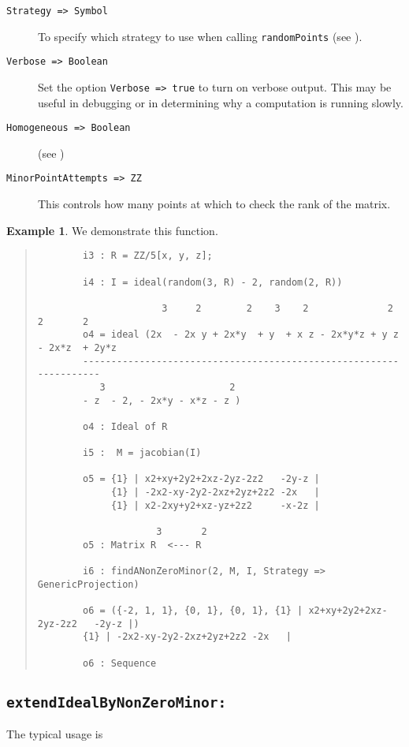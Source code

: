 \documentclass[11pt]{amsart}
\theoremstyle{definition}
\newtheorem{example}{Example}[section]
\begin{document}
\begin{description}
\item[\tt Strategy => Symbol] To specify which strategy to use when calling {\tt randomPoints} (see ).
  
\item[\tt Verbose => Boolean]
  Set the option {\tt Verbose => true} to turn on verbose output.  This may be useful in debugging or in determining why a computation is running slowly.
  
\item[\tt Homogeneous => Boolean] (see )
  
\item[\tt MinorPointAttempts => ZZ] 
  This controls how many points at which to check the rank of the matrix.
\end{description}
\vspace{0.25em}
\begin{example}
  We demonstrate this function.
  ~~
  {{\small\color{blue}
  \begin{quote}
\begin{verbatim}
		i3 : R = ZZ/5[x, y, z];
		
		i4 : I = ideal(random(3, R) - 2, random(2, R))
		
		              3     2        2    3    2              2        2       2
		o4 = ideal (2x  - 2x y + 2x*y  + y  + x z - 2x*y*z + y z - 2x*z  + 2y*z 
		-------------------------------------------------------------------
		   3                      2
		- z  - 2, - 2x*y - x*z - z )
		
		o4 : Ideal of R
		
		i5 :  M = jacobian(I)
		
		o5 = {1} | x2+xy+2y2+2xz-2yz-2z2   -2y-z |
		     {1} | -2x2-xy-2y2-2xz+2yz+2z2 -2x   |
		     {1} | x2-2xy+y2+xz-yz+2z2     -x-2z |
		
		             3       2
		o5 : Matrix R  <--- R
		
		i6 : findANonZeroMinor(2, M, I, Strategy => GenericProjection)
		
		o6 = ({-2, 1, 1}, {0, 1}, {0, 1}, {1} | x2+xy+2y2+2xz-2yz-2z2   -2y-z |)
		{1} | -2x2-xy-2y2-2xz+2yz+2z2 -2x   |
		
		o6 : Sequence
\end{verbatim}
\end{quote}\vspace{-1em}    
    }}
\end{example}

\subsection{\tt extendIdealByNonZeroMinor:}\label{extendIdealByNonZeroMinor} The typical usage is 
\end{document}
